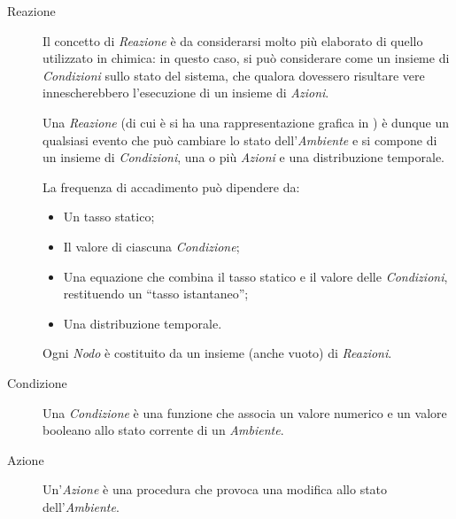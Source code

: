 \begin{description}
\begin{figure}[htbp]
{              %
          }%
          \label{fig:alchemist:reaction}
        \end{figure}

      \item[Reazione]\label{itm:react}
        Il concetto di \emph{Reazione} è da considerarsi molto più elaborato di quello utilizzato in chimica:
        in questo caso, si può considerare come un insieme di \emph{Condizioni} sullo stato del sistema, che qualora dovessero risultare vere innescherebbero l'esecuzione di un insieme di \emph{Azioni}.

        Una \emph{Reazione} (di cui è si ha una rappresentazione grafica in ) è dunque un qualsiasi evento che può cambiare lo stato dell'\emph{Ambiente} e si compone di un insieme di \emph{Condizioni}, una o più \emph{Azioni} e una distribuzione temporale.

        La frequenza di accadimento può dipendere da:
        \begin{itemize}
            \item Un tasso statico;
            \item Il valore di ciascuna \emph{Condizione};
            \item Una equazione che combina il tasso statico e il valore delle \emph{Condizioni}, restituendo un ``tasso istantaneo'';
            \item Una distribuzione temporale.
        \end{itemize}

        Ogni \emph{Nodo} è costituito da un insieme (anche vuoto) di \emph{Reazioni}.

      \item[Condizione]\label{itm:cond}
        Una \emph{Condizione} è una funzione che associa un valore numerico e un valore booleano allo stato corrente di un \emph{Ambiente}.

      \item[Azione]\label{itm:act}
        Un'\emph{Azione} è una procedura che provoca una modifica allo stato dell'\emph{Ambiente}.

      \end{description}


